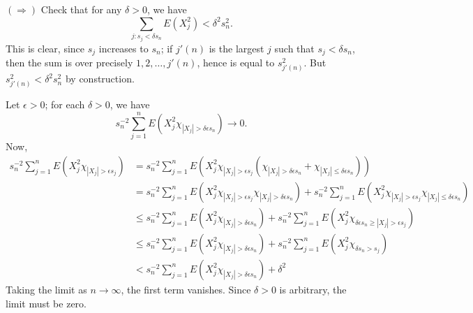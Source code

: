 \documentclass[10pt]{article}
\begin{document}
    $(\Rightarrow)$ Check that for any $\delta > 0$, we have \[
        \sum_{j: s_j < \delta s_n} E(X_j^2) < \delta^2 s_n^2.
    \] This is clear, since $s_j$ increases to $s_n$; if $j'(n)$ is the largest $j$
    such that $s_j < \delta s_n$, then the sum is over precisely $1, 2, \dots,
    j'(n)$, hence is equal to $s_{j'(n)}^2$. But $s_{j'(n)}^2 < \delta^2 s_n^2$ by
    construction.

    Let $\epsilon > 0$; for each $\delta > 0$, we have \[
        s_n^{-2} \sum_{j = 1}^n E(X_j^2 \chi_{|X_j| > \delta\epsilon s_n}) \to 0.
    \] Now, \begin{align*}
        s_n^{-2} \sum_{j = 1}^n E(X_j^2 \chi_{|X_j| > \epsilon s_j})
        &= s_n^{-2} \sum_{j = 1}^n E(X_j^2 \chi_{|X_j| > \epsilon s_j} (\chi_{|X_j| >
        \delta \epsilon s_n} + \chi_{|X_j| \leq \delta\epsilon s_n})) \\
        &= s_n^{-2} \sum_{j = 1}^n E(X_j^2 \chi_{|X_j| >
        \epsilon s_j} \chi_{|X_j| > \delta\epsilon s_n}) +
        s_n^{-2} \sum_{j = 1}^n E(X_j^2 \chi_{|X_j| >
        \epsilon s_j} \chi_{|X_j| \leq \delta\epsilon s_n}) \\
        &\leq s_n^{-2} \sum_{j = 1}^n E(X_j^2 \chi_{|X_j| >
        \delta \epsilon s_n}) +
        s_n^{-2} \sum_{j = 1}^n E(X_j^2 \chi_{\delta\epsilon s_n \geq |X_j| >
        \epsilon s_j}) \\
        &\leq s_n^{-2} \sum_{j = 1}^n E(X_j^2 \chi_{|X_j| >
        \delta \epsilon s_n}) +
        s_n^{-2} \sum_{j = 1}^n E(X_j^2 \chi_{\delta s_n > s_j}) \\
        &< s_n^{-2} \sum_{j = 1}^n E(X_j^2 \chi_{|X_j| >
        \delta \epsilon s_n}) + \delta^2
    \end{align*}
    Taking the limit as $n \to \infty$, the first term vanishes. Since $\delta > 0$
    is arbitrary, the limit must be zero.
\end{document}
